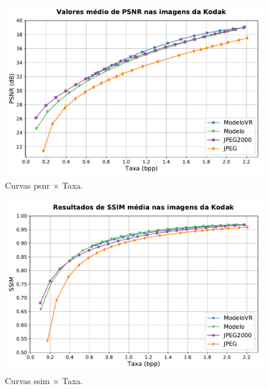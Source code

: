 \begin{figure}[h]
	\centering
	\includegraphics[width=1.0\textwidth]{figuras/comp_codecs.pdf}
	\caption[Comparações de autocodificadores com o \acrshort{jpeg} e \acrshort{jpeg}2000 em \acrshort{psnr}.]{Curvas \acrshort{psnr} $\times$ Taxa.}  	
	\label{fig:comp_psnr}
\end{figure}

\begin{figure}[h]
	\centering
	\includegraphics[width=1.0\textwidth]{figuras/comp_codecs_ssim.pdf}
	\caption[Comparações de autocodificadores com o \acrshort{jpeg} e \acrshort{jpeg}2000 em \acrshort{ssim}]{Curvas \acrshort{ssim} $\times$ Taxa.}  	
	\label{fig:comp_ssim}
\end{figure}


